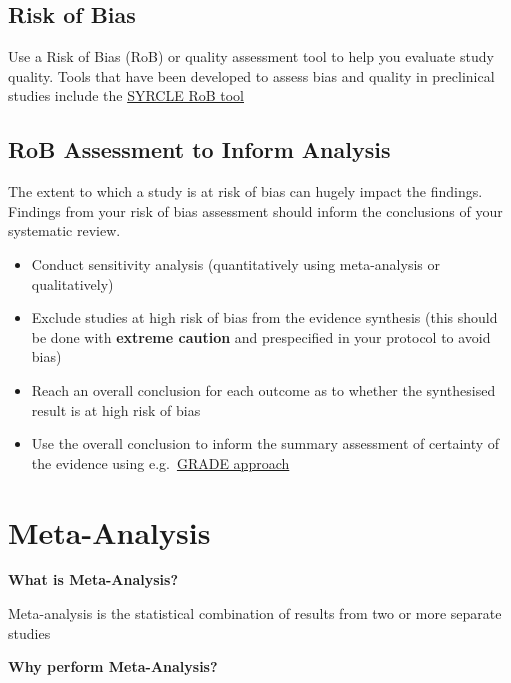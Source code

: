 \documentclass[
]{book}
\begin{document}
\hypertarget{risk-of-bias}{%
\section{Risk of Bias}\label{risk-of-bias}}

Use a Risk of Bias (RoB) or quality assessment tool to help you evaluate study quality. Tools that have been developed to assess bias and quality in preclinical studies include the \href{https://bmcmedresmethodol.biomedcentral.com/track/pdf/10.1186/1471-2288-14-43}{SYRCLE RoB tool}

\hypertarget{rob-assessment-to-inform-analysis}{%
\section{RoB Assessment to Inform Analysis}\label{rob-assessment-to-inform-analysis}}

The extent to which a study is at risk of bias can hugely impact the findings. Findings from your risk of bias assessment should inform the conclusions of your systematic review.

\begin{itemize}
\item
  Conduct sensitivity analysis
  (quantitatively using meta-analysis or qualitatively)
\item
  Exclude studies at high risk of bias from the evidence synthesis
  (this should be done with \textbf{extreme caution} and prespecified in your protocol to avoid bias)
\item
  Reach an overall conclusion for each outcome as to whether the synthesised result is at high risk of bias
\item
  Use the overall conclusion to inform the summary assessment of certainty of the evidence using e.g.~\href{https://bestpractice.bmj.com/info/toolkit/learn-ebm/what-is-grade/}{GRADE approach}
\end{itemize}

\hypertarget{meta-analysis}{%
\chapter{Meta-Analysis}\label{meta-analysis}}

\textbf{What is Meta-Analysis?}

Meta-analysis is the statistical combination of results from two or more separate studies

\textbf{Why perform Meta-Analysis?}
\end{document}
